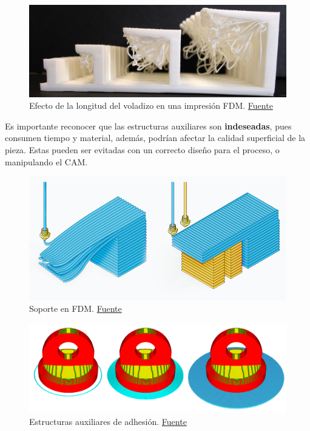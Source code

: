 \begin{figure}[h!]
	\centering
	\includegraphics[width=0.9\linewidth]{imgs/soportres.png}
	\caption{Efecto de la longitud del voladizo en una impresión FDM. \href{https://3dprinting.eng.unimelb.edu.au/pdf/3D-printing-tips-and-tricks.pdf}{Fuente}}
	\label{soportresfig}
\end{figure} 

Es importante reconocer que las estructuras auxiliares son \textbf{indeseadas}, pues consumen tiempo y material, además, podrían afectar la calidad superficial de la pieza. Estas pueden ser evitadas con un correcto diseño para el proceso, o manipulando el CAM.

\begin{figure}[h!]
	\centering
	\includegraphics[width=0.8\linewidth]{imgs/soportes.png}
	\caption{Soporte en FDM. \href{https://www.bcn3d.com/technology/}{Fuente}}
	\label{soportesfig}
\end{figure} 


\begin{figure}[h!]
	\centering
	\includegraphics[width=0.8\linewidth]{imgs/adesion.png}
	\caption{Estructuras auxiliares de adhesión. \href{https://support.makerbot.com/s/article/1667417985477}{Fuente}}
	\label{adesionfig}
\end{figure} 

